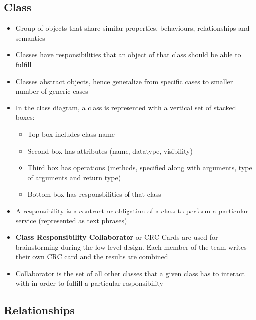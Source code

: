 \documentclass{article}
\begin{document}
\subsection{Class}
\begin{itemize}
    \item Group of objects that share similar properties, behaviours, relationships and semantics
    
    \item Classes have responsibilities that an object of that class should be able to fulfill
    
    \item Classes abstract objects, hence generalize from specific cases to smaller number of generic cases
    
    \item In the class diagram, a class is represented with a vertical set of stacked boxes:
    \begin{itemize}
        \item Top box includes class name
        
        \item Second box has attributes (name, datatype, visibility)
        
        \item Third box has operations (methods, specified along with arguments, type of arguments and return type)
        
        \item Bottom box has responsbilities of that class
    \end{itemize}
    
    \item A responsibility is a contract or obligation of a class to perform a particular service (represented as text phrases) 
    
    \item \textbf{Class Responsibility Collaborator} or CRC Cards are used for brainstorming during the low level design. Each member of the team writes their own CRC card and the results are combined
    
    \item Collaborator is the set of all other classes that a given class has to interact with in order to fulfill a particular responsibility
\end{itemize}

\subsection{Relationships}
\end{document}
